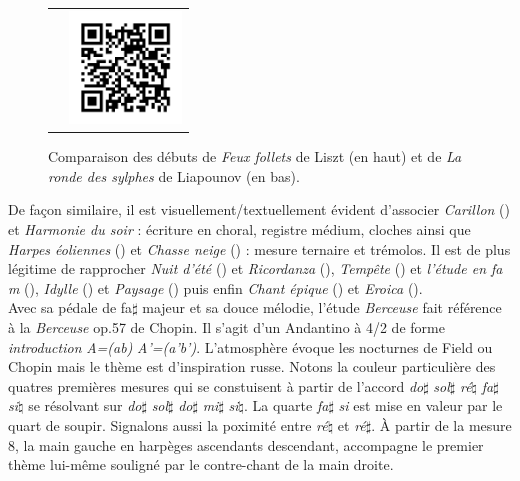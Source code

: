 \begin{figure}[!p]
\begin{bigcenter}
\begin{tabular}{lr}
      &
      \includegraphics[width=3cm, keepaspectratio]{op11-xi-qr.png}
    \end{tabular}
  \end{bigcenter}
  \caption{\label{op11-xi}Comparaison des débuts de \emph{Feux follets} de Liszt (en haut) et de \emph{La ronde des sylphes} de Liapounov (en bas).}
\end{figure}

De façon similaire, il est visuellement/textuellement évident d'associer \emph{Carillon} () et \emph{Harmonie du soir} : écriture en choral, registre médium, cloches ainsi que \emph{Harpes éoliennes} () et \emph{Chasse neige} () : mesure ternaire et trémolos. Il est de plus légitime de rapprocher \emph{Nuit d'été} () et \emph{Ricordanza} (), \emph{Tempête} () et \emph{l'étude en fa m} (), \emph{Idylle} () et \emph{Paysage} () puis enfin \emph{Chant épique} () et \emph{Eroica} ().\\

Avec sa pédale de fa$\sharp$ majeur et sa douce mélodie, l'étude \emph{Berceuse}  fait référence à la \emph{Berceuse} op.57 de Chopin. Il s'agit d'un Andantino à 4/2 de forme \emph{introduction} \emph{A=(ab)} \emph{A'=(a'b')}. L’atmosphère évoque les nocturnes de Field ou Chopin mais le thème est d'inspiration russe. Notons la couleur particulière des quatres premières mesures qui se constuisent à partir de l'accord \emph{do}$\sharp$ \emph{sol}$\sharp$ \emph{ré}$\natural$ \emph{fa}$\sharp$ \emph{si}$\natural$ se résolvant sur \emph{do}$\sharp$ \emph{sol}$\sharp$ \emph{do}$\sharp$ \emph{mi}$\sharp$ \emph{si}$\natural$. La quarte \emph{fa}$\sharp$ \emph{si} est mise en valeur par le quart de soupir. Signalons aussi la poximité entre \emph{ré}$\natural$ et \emph{ré}$\sharp$. À partir de la mesure 8, la main gauche en harpèges ascendants descendant, accompagne le premier thème lui-même souligné par le contre-chant de la main droite.

